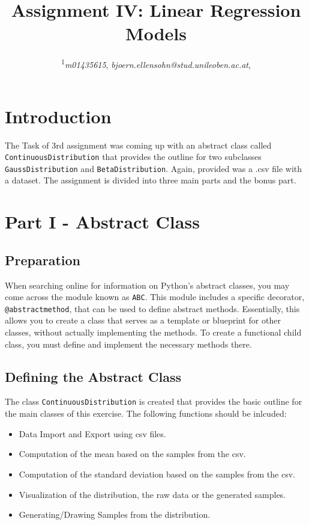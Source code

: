 \documentclass{CPSReport}
\title{Assignment IV: Linear Regression Models} %
\author{
	\coursetitle{Introduction to Machine Learning Lab (190.013), SS2023}
	\authorstyle{Björn Ellensohn\textsuperscript{1}} %
	\newline\newline %
	\textsuperscript{1}\textit{m01435615}, \textit{bjoern.ellensohn@stud.unileoben.ac.at}, \institution{Montanuniversität Leoben, Austria}\\ %
	\submissiondate{\today} %
}
\begin{document}
\maketitle %

\thispagestyle{firstpage} %



\section{Introduction}
The Task of 3rd assignment was coming up with an abstract class called \texttt{ContinuousDistribution} that provides the outline for two subclasses \texttt{GaussDistribution} and \texttt{BetaDistribution}.
Again, provided was a .csv file with a dataset.
The assignment is divided into three main parts and the bonus part.

\section{Part I - Abstract Class}
\subsection{Preparation}
When searching online for information on Python's abstract classes, you may come across the module known as \texttt{ABC}. This module includes a specific decorator, \texttt{@abstractmethod}, that can be used to define abstract methods. Essentially, this allows you to create a class that serves as a template or blueprint for other classes, without actually implementing the methods. To create a functional child class, you must define and implement the necessary methods there.

\subsection{Defining the Abstract Class}
The class \texttt{ContinuousDistribution} is created that provides the basic outline for the main classes of this exercise. The following functions should be inlcuded:
\begin{itemize}
    \item Data Import and Export using csv files.
    \item Computation of the mean based on the samples from the csv.
    \item Computation of the standard deviation based on the samples from the csv.
    \item Visualization of the distribution, the raw data or the generated samples.
    \item Generating/Drawing Samples from the distribution. 
\end{itemize}
\end{document}
